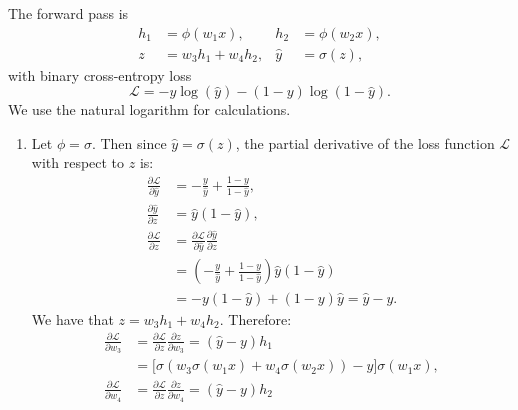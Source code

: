 \documentclass[12pt]{article}
\begin{document}
\begin{enumerate}
\begin{center}
   \end{center}

   The forward pass is
   \[
   \begin{aligned}
       h_1 &= \phi(w_1x), & h_2 &= \phi(w_2x), \\
       z &= w_3h_1+w_4h_2, & \hat y &= \sigma(z),
   \end{aligned}
   \]
   with binary cross-entropy loss
   \[
       \mathcal L=-y\log(\hat y)-(1-y)\log(1-\hat y).
   \]
   We use the natural logarithm for calculations.

   \begin{enumerate}[label=\textbf{\Alph*.}, leftmargin=*]
       \item Let $\phi=\sigma$. Then since $\hat{y} = \sigma(z)$, the partial derivative of the loss function $\mathcal L$ with respect to $z$ is:
       \[
       \begin{aligned}
           \frac{\partial\mathcal L}{\partial\hat y}
               &=-\frac{y}{\hat y}+\frac{1-y}{1-\hat y}, \\
           \frac{\partial\hat y}{\partial z}
               &=\hat y(1-\hat y), \\
           \frac{\partial\mathcal L}{\partial z}
               &=\frac{\partial\mathcal L}{\partial\hat y}
                 \frac{\partial\hat y}{\partial z} \\
               &=\left(-\frac{y}{\hat y}+\frac{1-y}{1-\hat y}\right)
                 \hat y(1-\hat y) \\
               &=-y(1-\hat y)+(1-y)\hat y
                =\boxed{\hat y-y}.
       \end{aligned}
       \]
       We have that $z = w_3h_1 + w_4h_2$. Therefore: 
       \[
       \begin{aligned}
           \frac{\partial\mathcal L}{\partial w_3}
               &=\frac{\partial\mathcal L}{\partial z}
                 \frac{\partial z}{\partial w_3}
                =(\hat{y}-y)h_1 \\
               &=\boxed{\bigl[\sigma(w_3\sigma(w_1x)+w_4\sigma(w_2x))-y\bigr]
                         \sigma(w_1x)}, \\
           \frac{\partial\mathcal L}{\partial w_4}
               &=\frac{\partial\mathcal L}{\partial z}
                 \frac{\partial z}{\partial w_4}
                =(\hat{y}-y)h_2 \\

\end{aligned}\]
\end{enumerate}
\end{enumerate}
\end{document}
